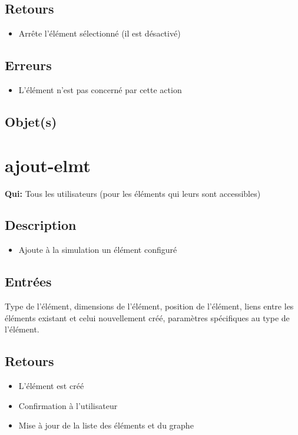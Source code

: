 	\subsection{Retours}
	\begin{itemize}
		\item Arrête l'élément sélectionné (il est désactivé)
	\end{itemize}

	\subsection{Erreurs}
	\begin{itemize}
		\item L'élément n'est pas concerné par cette action \fatal
	\end{itemize}

	\subsection{Objet(s)}
		\autobjs

\section{ajout-elmt}
	\textbf{Qui:} Tous les utilisateurs (pour les éléments qui leurs sont accessibles)

	\subsection{Description}
	\begin{itemize}
		\item Ajoute à la simulation un élément configuré
	\end{itemize}

	\subsection{Entrées}
		Type de l'élément, dimensions de l'élément, position de l'élément, liens entre les éléments existant et celui
		nouvellement créé, paramètres spécifiques au type de l'élément.

	\subsection{Retours}
	\begin{itemize}
		\item L'élément est créé
		\item Confirmation à l'utilisateur
		\item Mise à jour de la liste des éléments et du graphe
	\end{itemize}

